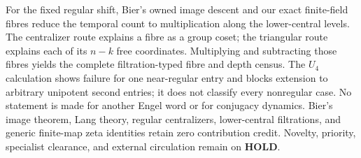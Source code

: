 \documentclass[10pt,a4paper]{amsart}
\theoremstyle{definition}
\theoremstyle{remark}
\begin{document}
For the fixed regular shift, Bier's owned image descent and our exact
finite-field fibres reduce the temporal count to multiplication along the
lower-central levels.  The centralizer route explains a fibre as a group
coset; the triangular route explains each of its $n-k$ free coordinates.
Multiplying and subtracting those fibres yields the complete
filtration-typed fibre and depth census.  The $U_4$ calculation shows failure
for one near-regular entry and blocks extension to arbitrary unipotent
second entries; it does not classify every nonregular case.  No statement is
made for another Engel word or for conjugacy dynamics.  Bier's image theorem,
Lang theory, regular centralizers, lower-central filtrations, and generic
finite-map zeta identities retain zero contribution credit.  Novelty,
priority, specialist clearance, and external circulation remain on
\textbf{HOLD}.



\end{document}
